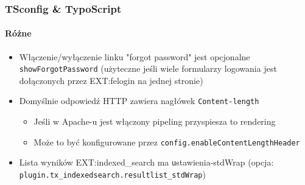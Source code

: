 %
%

\begin{frame}[fragile]
	\frametitle{TSconfig \& TypoScript}
	\framesubtitle{Różne}

	\begin{itemize}

		\item Włączenie/wyłączenie linku "forgot password" jest opcjonalne \small\texttt{showForgotPassword}\normalsize\newline
			(użyteczne jeśli wiele formularzy logowania jest dołączonych przez EXT:felogin na jednej stronie)

		\item Domyślnie odpowiedź HTTP zawiera nagłówek \texttt{Content-length}

			\begin{itemize}
				\item Jeśli w Apache-u jest włączony pipeling przyspiesza to rendering
				\item Może to być konfigurowane przez \texttt{config.enableContentLengthHeader}
			\end{itemize}

		\item Lista wyników EXT:indexed\_search ma \texttt ustawienia-{stdWrap}\newline
			(opcja: \texttt{plugin.tx\_indexedsearch.resultlist\_stdWrap})

	\end{itemize}

\end{frame}


